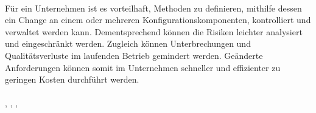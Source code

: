 \\
Für ein Unternehmen ist es vorteilhaft, Methoden zu definieren, mithilfe dessen ein Change an einem oder mehreren Konfigurationskomponenten, kontrolliert und verwaltet werden kann. Dementsprechend können die Risiken leichter analysiert und eingeschränkt werden. Zugleich können Unterbrechungen und Qualitätsverluste im laufenden Betrieb gemindert werden. Geänderte Anforderungen können somit im Unternehmen schneller und effizienter zu geringen Kosten durchführt werden. 
\\\\
\cite{cm-oldenburg}, \cite{cm-stolpersteine}, \cite{cm-itil} \cite{cm-bestpractices}, \cite{cm-munich}